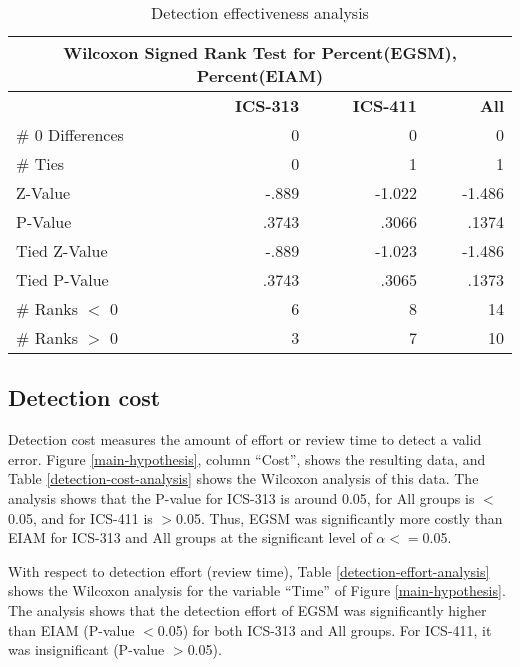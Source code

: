\begin{table}[htb]
 \caption{Detection effectiveness analysis}
 \begin{center}
 \begin{tabular}{|l|r|r|r|}
  \hline
  \multicolumn{4}{|c|}{\bf Wilcoxon Signed Rank Test for Percent(EGSM), Percent(EIAM)}\\
  \hline
  & {\bf ICS-313} & {\bf ICS-411} & {\bf All} \\ 
  \hline
  \# 0 Differences & 0     & 0      &  0 \\
  \# Ties          & 0     & 1      &  1 \\
  Z-Value          & -.889 & -1.022 & -1.486\\
  P-Value          & .3743 & .3066  & .1374\\
  Tied Z-Value     & -.889 & -1.023 & -1.486\\
  Tied P-Value     & .3743 & .3065  & .1373\\
  \# Ranks $<$ 0   & 6     & 8      & 14\\
  \# Ranks $>$ 0   & 3     & 7      & 10\\
  \hline
   \end{tabular}
  \end{center}
  \label{detection-effectiveness-analysis}
\end{table} 

\subsection{Detection cost}
Detection cost measures the amount of effort or review time to detect
a valid error. 
Figure \ref{main-hypothesis}, column ``Cost'', shows the resulting
data, and Table \ref{detection-cost-analysis} shows 
the Wilcoxon analysis of this data. 
The analysis shows that the P-value for ICS-313 is around 0.05,
for All groups is $<$0.05, and for ICS-411 is $>$0.05.
Thus, EGSM was significantly more costly than EIAM for ICS-313 and All
groups at the significant level of $\alpha<=$0.05. 

With respect to detection effort (review time), Table
\ref{detection-effort-analysis} shows the Wilcoxon analysis for
the variable ``Time'' of Figure \ref{main-hypothesis}. The analysis shows
that the detection effort of EGSM was significantly higher than EIAM
(P-value $<$0.05) for both ICS-313 and All groups. For ICS-411, it was
insignificant (P-value $>$0.05).

